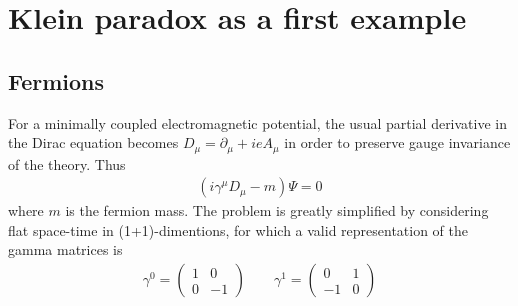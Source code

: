
\section{Klein paradox as a first example} 

\subsection{Fermions}

For a minimally coupled electromagnetic potential, the usual partial derivative in the Dirac equation becomes $D_\mu = \partial_\mu + i e A_\mu$ in order to preserve gauge invariance of the theory. Thus
\begin{align}
    ( i \gamma^\mu D_\mu - m ) \Psi = 0
    \label{eq:dirac}
\end{align}
where $m$ is the fermion mass.
The problem is greatly simplified by considering flat space-time in (1+1)-dimentions, for which a valid representation of the gamma matrices is
\begin{align}
    \gamma^0 = \left(\begin{array}{cr} 1 & 0 \\  0 & -1 \end{array}\right) \qquad 
    \gamma^1 = \left(\begin{array}{cr} 0 & 1 \\ -1 & 0 \end{array}\right)
    \label{eq:gamma1+1}
\end{align}

